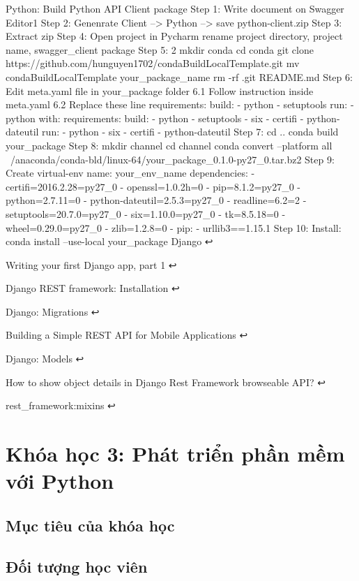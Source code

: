 Python: Build Python API Client package
Step 1: Write document on Swagger Editor1
Step 2: Genenrate Client --> Python --> save python-client.zip
Step 3: Extract zip
Step 4: Open project in Pycharm rename project directory, project name, swagger_client package
Step 5: 2
mkdir conda
cd conda
git clone https://github.com/hunguyen1702/condaBuildLocalTemplate.git
mv condaBuildLocalTemplate your_package_name
rm -rf .git README.md
Step 6: Edit meta.yaml file in your_package folder
6.1 Follow instruction inside meta.yaml
6.2 Replace these line
requirements:
  build:
    - python
    - setuptools
  run:
    - python
with:
requirements:
  build:
    - python
    - setuptools
    - six
    - certifi
    - python-dateutil
  run:
    - python
    - six
    - certifi
    - python-dateutil
Step 7:
cd ..
conda build your_package
Step 8:
mkdir channel
cd channel
conda convert --platform all ~/anaconda/conda-bld/linux-64/your_package_0.1.0-py27_0.tar.bz2
Step 9: Create virtual-env
name: your_env_name
dependencies:
- certifi=2016.2.28=py27_0
- openssl=1.0.2h=0
- pip=8.1.2=py27_0
- python=2.7.11=0
- python-dateutil=2.5.3=py27_0
- readline=6.2=2
- setuptools=20.7.0=py27_0
- six=1.10.0=py27_0
- tk=8.5.18=0
- wheel=0.29.0=py27_0
- zlib=1.2.8=0
- pip:
  - urllib3==1.15.1
Step 10: Install:
conda install --use-local your_package
Django ↩

Writing your first Django app, part 1 ↩

Django REST framework: Installation ↩

Django: Migrations ↩

Building a Simple REST API for Mobile Applications ↩

Django: Models ↩

How to show object details in Django Rest Framework browseable API? ↩

rest_framework:mixins ↩

\section{Khóa học 3: Phát triển phần mềm với Python}

\subsection{Mục tiêu của khóa học}

\subsection{Đối tượng học viên}

